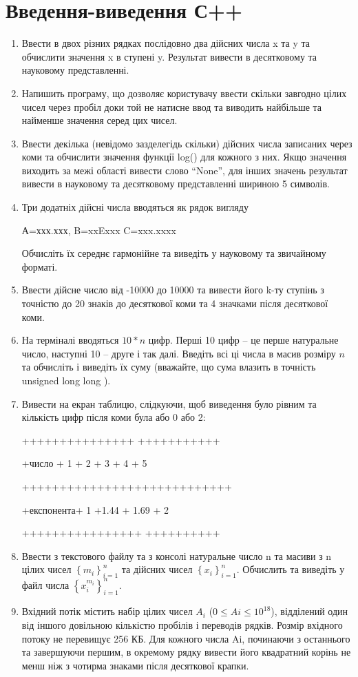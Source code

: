 \documentclass[]{article}
\begin{document}
\section {Введення-виведення С++}
\begin{enumerate}
\item
Ввести в двох різних рядках
послідовно два дійсних числа x та y та обчислити значення x в ступені y.
Результат вивести в десятковому та науковому представленні.

\item
Напишить програму, що дозволяє користувачу ввести скільки завгодно цілих чисел через 
пробіл доки той не натисне ввод та виводить найбільше та найменше значення серед цих чисел. 

\item Ввести декілька (невідомо
зазделегідь скільки) дійсних числа записаних через коми та обчислити
значення функції log() для кожного з них. Якщо значення виходить за межі
області вивести слово ``None'', для інших значень результат вивести в
науковому та десятковому представленні шириною 5 символів.
\item
Три додатніх дійсні числа вводяться як рядок вигляду

А=ххх.ххх, B=xxExxx C=xxx.xxxx

Обчисліть їх середнє гармонійне та виведіть у науковому та звичайному
форматі.

\item
Ввести дійсне число від -10000 до 10000 та вивести його k-ту ступінь з
точністю до 20 знаків до десяткової коми та 4 значками після десяткової
коми.

\item
На терміналі вводяться $10*n$ цифр.
Перші 10 цифр -- це перше натуральне число, наступні 10 -- друге і так
далі. Введіть всі ці числа в масив розміру $n$ та обчисліть і виведіть їх
суму (вважайте, що сума влазить в точність unsigned long long ).

\item
Вивести на екран таблицю, слідкуючи, щоб виведення було рівним та
кількість цифр після коми була або 0 або 2:

+++++++++++++++ +++++++++++

+число + 1 + 2 + 3 + 4 + 5

++++++++++++++++++++++++++++

+експонента+ 1 +1.44 + 1.69 + 2

++++++++++++++++ ++++++++++

\item
Ввести з текстового файлу та з консолі натуральне число n та масиви з n
цілих чисел \(\left\{ m_{i} \right\}_{i = 1}^{n}\) та дійсних чисел
\(\left\{ x_{i} \right\}_{i = 1}^{n}\). Обчислить та виведіть у файл
числа \(\left\{ x_{i}^{m_{i}} \right\}_{i = 1}^{n}\).
\item
Вхідний потік містить набір цілих
чисел $A_i$ ($0 \le Ai \le 10^{18}$), відділений один від іншого
довільною кількістю пробілів і переводів рядків. Розмір вхідного потоку
не перевищує 256 КБ. Для кожного числа Ai, починаючи з останнього та
завершуючи першим, в окремому рядку вивести його квадратний корінь не
менш ніж з чотирма знаками після десяткової крапки.


\end{enumerate}
\end{document}
